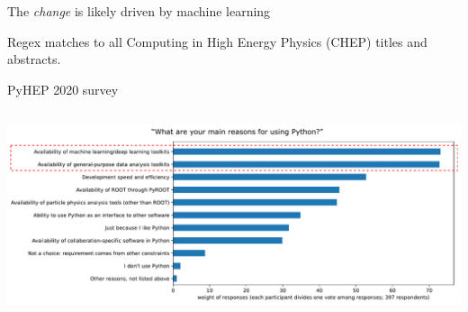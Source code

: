 \documentclass[aspectratio=169]{beamer}
\begin{document}
\begin{frame}{The {\it change} is likely driven by machine learning}
\vspace{0.25 cm}

Regex matches to all Computing in High Energy Physics (CHEP) titles and abstracts.

\vspace{-0.1 cm}
\begin{center}
\end{center}
\end{frame}

\begin{frame}{PyHEP 2020 survey}
\vspace{0.5 cm}
\begin{columns}
\includegraphics[width=\linewidth]{PLOTS/pyhep2020-why-use-python.pdf}
\end{columns}
\end{frame}
\end{document}
